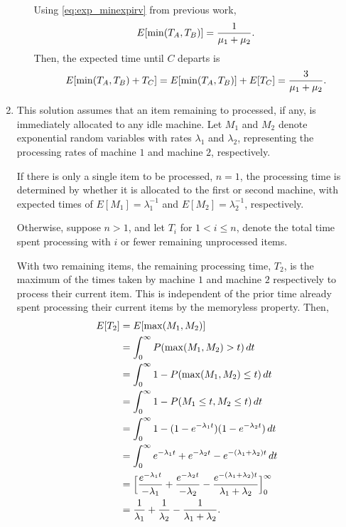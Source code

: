 \documentclass{article}
\begin{document}
\begin{enumerate}
\begin{enumerate}
        Using \eqref{eq:exp_minexpirv} from previous work, $$E[\min(T_A,T_B)]=\frac{1}{\mu_1+\mu_2}\text.$$
        Then, the expected time until $C$ departs is
        $$E[\min(T_A,T_B) + T_C] = E[\min(T_A,T_B)] + E[T_C] = \frac{3}{\mu_1+\mu_2}\text.$$
    \end{enumerate}
\item
    This solution assumes that an item remaining to processed, if any, is immediately allocated to any idle machine. Let $M_1$ and $M_2$
    denote exponential random variables with rates $\lambda_1$ and $\lambda_2$, representing the processing rates of machine $1$ and machine
    $2$, respectively.

    If there is only a single item to be processed, $n=1$, the processing time is determined by whether it is allocated to
    the first or second machine, with expected times of $E[M_1]=\lambda_1^{-1}$ and $E[M_2]=\lambda_2^{-1}$, respectively.

    Otherwise, suppose $n>1$, and let $T_i$ for $1< i\leq n$, denote the total time spent processing with $i$ or fewer remaining unprocessed items.

    With two remaining items, the remaining processing time, $T_2$, is the maximum of the times taken by machine $1$ and machine $2$ respectively to
    process their current item. This is independent of the prior time already spent processing their current items by the memoryless
    property. Then,
    \begin{equation*}\begin{split}
    E[T_2]  & = E[\max(M_1, M_2)] \\
            & = \int_0^\infty P(\max(M_1,M_2)>t)\, dt \\
            & = \int_0^\infty 1-P(\max(M_1,M_2)\leq t)\, dt \\
            & = \int_0^\infty 1-P(M_1\leq t, M_2\leq t)\, dt \\
            & = \int_0^\infty 1-(1-e^{-\lambda_1t})(1-e^{-\lambda_2t})\, dt \\
            & = \int_0^\infty e^{-\lambda_1t} + e^{-\lambda_2t} - e^{-(\lambda_1+\lambda_2)t}\, dt \\
            & = \Big[ \frac{e^{-\lambda_1t}}{-\lambda_1} + \frac{e^{-\lambda_2t}}{-\lambda_2} - \frac{e^{-(\lambda_1+\lambda_2)t}}{\lambda_1+\lambda_2}\Big]_0^\infty \\
            & = \frac{1}{\lambda_1} + \frac{1}{\lambda_2} - \frac{1}{\lambda_1+\lambda_2}\text. \\
    \end{split}\end{equation*}


\end{enumerate}
\end{document}
